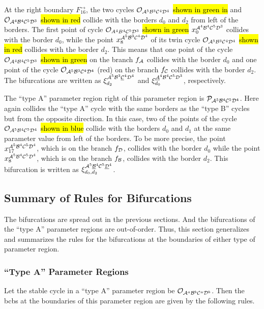At the right boundary $F_{16}^\rightarrow$, the two cycles $\mathcal{O}_{\mathcal{A}^5\mathcal{B}^3\mathcal{C}^4\mathcal{D}^4}$ \hl{shown in green in}  and $\mathcal{O}_{\mathcal{A}^4\mathcal{B}^4\mathcal{C}^5\mathcal{D}^3}$ \hl{shown in red} collide with the borders $d_0$ and $d_2$ from left of the borders.
The first point of cycle $\mathcal{O}_{A^4B^4\mathcal{C}^5\mathcal{D}^3}$ \hl{shown in green} $x_{0}^{\mathcal{A}^4\mathcal{B}^4\mathcal{C}^5\mathcal{D}^3}$ collides with the border $d_0$, while the point $x_{8}^{\mathcal{A}^5\mathcal{B}^3\mathcal{C}^4\mathcal{D}^4}$ of its twin cycle $\mathcal{O}_{\mathcal{A}^5\mathcal{B}^3\mathcal{C}^4\mathcal{D}^4}$ \hl{shown in red} collides with the border $d_2$.
This means that one point of the cycle $\mathcal{O}_{\mathcal{A}^4\mathcal{B}^4\mathcal{C}^5\mathcal{D}^3}$ \hl{shown in green} on the branch $f_{\mathcal{A}}$ collides with the border $d_0$ and one point of the cycle $\mathcal{O}_{\mathcal{A}^5\mathcal{B}^3\mathcal{C}^4\mathcal{D}^4}$ (red) on the branch $f_{\mathcal{C}}$ collides with the border $d_2$.
The bifurcations are written as $\xi_{d_2}^{\mathcal{A}^5\mathcal{B}^3\underline{\mathcal{C}}^4\mathcal{D}^4}$ and $\xi_{d_0}^{\underline{\mathcal{A}}^4\mathcal{B}^4\mathcal{C}^5\mathcal{D}^3}$, respectively.

The ``type A'' parameter region right of this parameter region is $\mathcal{P}_{\mathcal{A}^5\mathcal{B}^4\mathcal{C}^5\mathcal{D}^4}$.
Here again collides the ``type A'' cycle with the same borders as the ``type B'' cycles but from the opposite direction.
In this case, two of the points of the cycle $\mathcal{O}_{\mathcal{A}^5\mathcal{B}^4\mathcal{C}^5\mathcal{D}^4}$ \hl{shown in blue} collide with the borders $d_0$ and $d_1$ at the same parameter value from left of the borders.
To be more precise, the point $x_{17}^{\mathcal{A}^5\mathcal{B}^4\mathcal{C}^5\mathcal{D}^4}$, which is on the branch $f_{\mathcal{D}}$, collides with the border $d_0$ while the point $x_{8}^{\mathcal{A}^5\mathcal{B}^4\mathcal{C}^5\mathcal{D}^4}$, which is on the branch $f_{\mathcal{B}}$, collides with the border $d_2$.
This bifurcation is written as $\xi_{d_0, d_2}^{\mathcal{A}^5\underline{\mathcal{B}}^4\mathcal{C}^5\underline{\mathcal{D}}^4}$.

\subsection{Summary of Rules for Bifurcations}
\label{sec:arch.bif.sum}

The bifurcations are spread out in the previous sections.
And the bifurcations of the ``type A'' parameter regions are out-of-order.
Thus, this section generalizes and summarizes the rules for the bifurcations at the boundaries of either type of parameter region.

\subsubsection{``Type A'' Parameter Regions}

Let the stable cycle in a ``type A'' parameter region be $\mathcal{O}_{\mathcal{A}^a\mathcal{B}^b\mathcal{C}^a\mathcal{D}^b}$.
Then the \glspl{bcb} at the boundaries of this parameter region are given by the following rules.

